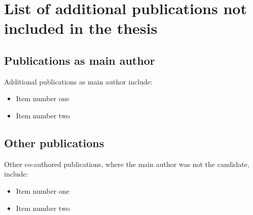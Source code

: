 \chapter{List of additional publications not included in the thesis}
\label{app-excl_pubs}


\section{Publications as main author}

Additional publications as main author include:

\begin{itemize}
	
	\item Item number one
	
	\item Item number two

\end{itemize}

\section{Other publications}

Other co-authored publications, where the main author was not the candidate, include:

\begin{itemize}

	\item Item number one
	
	\item Item number two

\end{itemize}